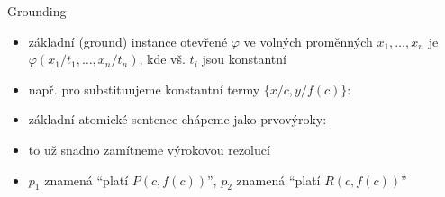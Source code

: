 \documentclass{beamer}
\begin{document}
\begin{frame}{Grounding}

    \pause
    \begin{itemize}
        \item \alert{základní (ground) instance} otevřené $\varphi$ ve volných proměnných $x_1,\dots,x_n$ je $\varphi(x_1/t_1,\dots,x_n/t_n)$, kde vš. $t_i$ jsou konstantní
        
        \bigskip
        
        \pause
        \pause
        
        \bigskip
        \item např. pro  substituujeme \alert{konstantní} termy $\{x/c,y/f(c)\}$:
        \pause
        
        \pause

        \item základní atomické sentence chápeme jako prvovýroky: 
        
        \pause

        \item to už snadno zamítneme výrokovou rezolucí\pause
        \item $p_1$ znamená ``platí $P(c,f(c))$'', $p_2$ znamená ``platí $R(c,f(c))$''        
    \end{itemize}
    
\end{frame}
\end{document}
